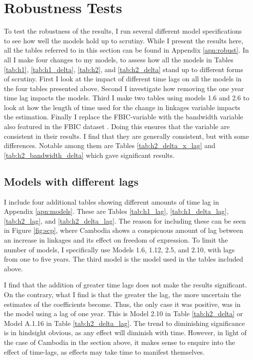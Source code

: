 \section{Robustness Tests} \label{sec:robust}
To test the robustness of the results, I run several different model specifications to see how well the models hold up to scrutiny. While I present the results here, all the tables referred to in this section can be found in Appendix \ref{apn:robust}. In all I make four changes to my models, to assess how all the models in Tables \ref{tab:h1}, \ref{tab:h1_delta}, \ref{tab:h2}, and \ref{tab:h2_delta} stand up to different forms of scrutiny. First I look at the impact of different time lags on all the models in the four tables presented above. Second I investigate how removing the one year time lag impacts the models. Third I make two tables using models 1.6 and 2.6 to look at how the length of time used for the change in linkages variable impacts the estimation. Finally I replace the FBIC-variable with the bandwidth variable also featured in the FBIC dataset \citep{moyer_china-us_2021}. Doing this ensures that the variable are consistent in their results. I find that they are generally consistent, but with some differences. Notable among them are Tables \ref{tab:h2_delta_x_lag} and \ref{tab:h2_bandwidth_delta} which gave significant results.

\subsection{Models with different lags}
I include four additional tables showing different amounts of time lag in Appendix \ref{apn:models}. These are Tables \ref{tab:h1_lag}, \ref{tab:h1_delta_lag}, \ref{tab:h2_lag}, and \ref{tab:h2_delta_lag}. The reason for including these can be seen in Figure \ref{fig:scp}, where Cambodia shows a conspicuous amount of lag between an increase in linkages and its effect on freedom of expression. To limit the number of models, I specifically use Models 1.6, 1.12, 2.5, and 2.10, with lags from one to five years. The third model is the model used in the tables included above. 

I find that the addition of greater time lags does not make the results significant. On the contrary, what I find is that the greater the lag, the more uncertain the estimates of the coefficients become. Thus, the only case it was positive, was in the model using a lag of one year. This is Model 2.10 in Table \ref{tab:h2_delta} or Model A.1.16 in Table \ref{tab:h2_delta_lag}. The trend to diminishing significance  is in hindsight obvious, as any effect will diminish with time. However, in light of the case of Cambodia in the section above, it makes sense to enquire into the effect of time-lags, as effects may take time to manifest themselves.

